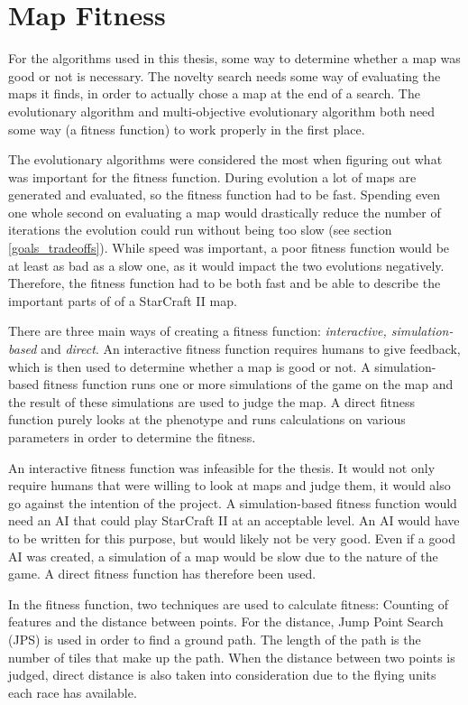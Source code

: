 \section{Map Fitness}
\label{methodology_mapfitness}

For the algorithms used in this thesis, some way to determine whether a map was good or not is necessary. The novelty search needs some way of evaluating the maps it finds, in order to actually chose a map at the end of a search. The evolutionary algorithm and multi-objective evolutionary algorithm both need some way (a fitness function) to work properly in the first place.

The evolutionary algorithms were considered the most when figuring out what was important for the fitness function. During evolution a lot of maps are generated and evaluated, so the fitness function had to be fast. Spending even one whole second on evaluating a map would drastically reduce the number of iterations the evolution could run without being too slow (see section \ref{goals_tradeoffs}). While speed was important, a poor fitness function would be at least as bad as a slow one, as it would impact the two evolutions negatively. Therefore, the fitness function had to be both fast and be able to describe the important parts of of a StarCraft II map.

There are three main ways of creating a fitness function\cite{Togelius2010Multiobjective}: \textit{interactive, simulation-based} and \textit{direct}. An interactive fitness function requires humans to give feedback, which is then used to determine whether a map is good or not. A simulation-based fitness function runs one or more simulations of the game on the map and the result of these simulations are used to judge the map. A direct fitness function purely looks at the phenotype and runs calculations on various parameters in order to determine the fitness.

An interactive fitness function was infeasible for the thesis. It would not only require humans that were willing to look at maps and judge them, it would also go against the intention of the project. A simulation-based fitness function would need an AI that could play StarCraft II at an acceptable level. An AI would have to be written for this purpose, but would likely not be very good. Even if a good AI was created, a simulation of a map would be slow due to the nature of the game. A direct fitness function has therefore been used.

In the fitness function, two techniques are used to calculate fitness: Counting of features and the distance between points. For the distance, Jump Point Search\cite{harabor11a, harabor12, Podhraski2013jps} (JPS) is used in order to find a ground path. The length of the path is the number of tiles that make up the path. When the distance between two points is judged, direct distance is also taken into consideration due to the flying units each race has available.

